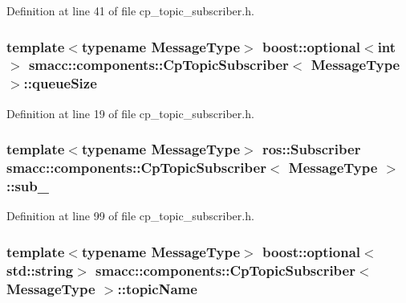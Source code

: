 Definition at line 41 of file cp\+\_\+topic\+\_\+subscriber.\+h.

\subsubsection[{\texorpdfstring{queue\+Size}{queueSize}}]{\setlength{\rightskip}{0pt plus 5cm}template$<$typename Message\+Type$>$ boost\+::optional$<$int$>$ {\bf smacc\+::components\+::\+Cp\+Topic\+Subscriber}$<$ Message\+Type $>$\+::queue\+Size}\hypertarget{classsmacc_1_1components_1_1CpTopicSubscriber_ad8775c1e5773a2c58d63ad2d64d28580}{}\label{classsmacc_1_1components_1_1CpTopicSubscriber_ad8775c1e5773a2c58d63ad2d64d28580}


Definition at line 19 of file cp\+\_\+topic\+\_\+subscriber.\+h.

\subsubsection[{\texorpdfstring{sub\+\_\+}{sub_}}]{\setlength{\rightskip}{0pt plus 5cm}template$<$typename Message\+Type$>$ ros\+::\+Subscriber {\bf smacc\+::components\+::\+Cp\+Topic\+Subscriber}$<$ Message\+Type $>$\+::sub\+\_\+\hspace{0.3cm}{\ttfamily [private]}}\hypertarget{classsmacc_1_1components_1_1CpTopicSubscriber_a87f9c87f6b7c0801dff4fcc7519dbe0e}{}\label{classsmacc_1_1components_1_1CpTopicSubscriber_a87f9c87f6b7c0801dff4fcc7519dbe0e}


Definition at line 99 of file cp\+\_\+topic\+\_\+subscriber.\+h.

\subsubsection[{\texorpdfstring{topic\+Name}{topicName}}]{\setlength{\rightskip}{0pt plus 5cm}template$<$typename Message\+Type$>$ boost\+::optional$<$std\+::string$>$ {\bf smacc\+::components\+::\+Cp\+Topic\+Subscriber}$<$ Message\+Type $>$\+::topic\+Name}\hypertarget{classsmacc_1_1components_1_1CpTopicSubscriber_a90e61b81d9bb33b886162eb41051fe1c}{}\label{classsmacc_1_1components_1_1CpTopicSubscriber_a90e61b81d9bb33b886162eb41051fe1c}



